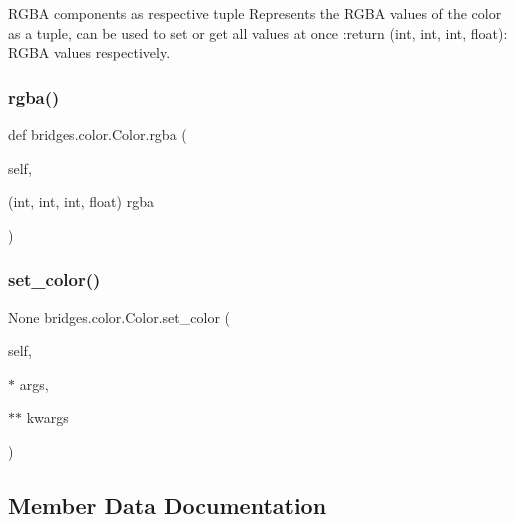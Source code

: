 R\+G\+BA components as respective tuple Represents the R\+G\+BA values of the color as a tuple, can be used to set or get all values at once \+:return (int, int, int, float)\+: R\+G\+BA values respectively. 

\mbox{\label{classbridges_1_1color_1_1_color_a3589024e5c4821134f8f54ac3fa3b7c1}} 
\subsubsection{\texorpdfstring{rgba()}{rgba()}\hspace{0.1cm}{\footnotesize\ttfamily [2/2]}}
{\footnotesize\ttfamily def bridges.\+color.\+Color.\+rgba (\begin{DoxyParamCaption}\item[{}]{self,  }\item[{(int, int, int, float)}]{rgba }\end{DoxyParamCaption})}

\mbox{\label{classbridges_1_1color_1_1_color_ad3f8ee817cc7f3fa0e9b606c791141e7}} 
\subsubsection{\texorpdfstring{set\_color()}{set\_color()}}
{\footnotesize\ttfamily  None bridges.\+color.\+Color.\+set\+\_\+color (\begin{DoxyParamCaption}\item[{}]{self,  }\item[{$\ast$}]{args,  }\item[{$\ast$$\ast$}]{kwargs }\end{DoxyParamCaption})}



\subsection{Member Data Documentation}
\mbox{\label{classbridges_1_1color_1_1_color_a2e170f068eeb77ace0427d23b36f2b27}} 
